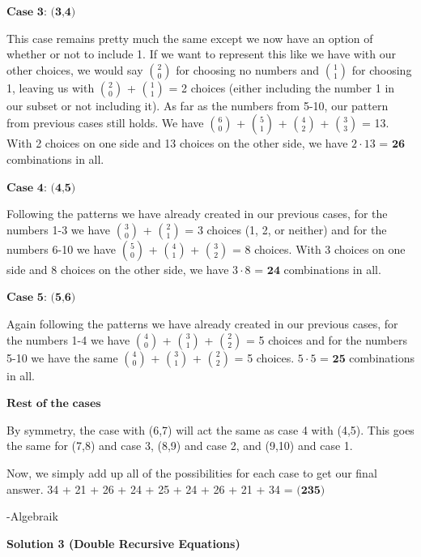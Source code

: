\begin{enumerate}
{{ 


 $\textbf{Case 3: (3,4)}$

 This case remains pretty much the same except we now have an option of whether or not to include 1. If we want to represent this like we have with our other choices, we would say $2 \choose {0}$ for choosing no numbers and $1 \choose {1}$ for choosing 1, leaving us with $2 \choose {0}$ + $1 \choose {1}$ = 2 choices (either including the number 1 in our subset or not including it). As far as the numbers from 5-10, our pattern from previous cases still holds. We have $6 \choose {0}$ + $5 \choose {1}$ + $4 \choose {2}$ + $3 \choose {3}$ = 13. With 2 choices on one side and 13 choices on the other side, we have $2\cdot13$ = $\textbf{26}$ combinations in all.

 


 $\textbf{Case 4: (4,5)}$

 Following the patterns we have already created in our previous cases, for the numbers 1-3 we have $3 \choose {0}$ + $2 \choose {1}$ = 3 choices (1, 2, or neither) and for the numbers 6-10 we have $5 \choose {0}$ + $4 \choose {1}$ + $3 \choose {2}$ = 8 choices. With 3 choices on one side and 8 choices on the other side, we have $3\cdot8$ = $\textbf{24}$ combinations in all.

 


 $\textbf{Case 5: (5,6)}$

 Again following the patterns we have already created in our previous cases, for the numbers 1-4 we have $4 \choose {0}$ + $3 \choose {1}$ + $2 \choose {2}$ = 5 choices and for the numbers 5-10 we have the same $4 \choose {0}$ + $3 \choose {1}$ + $2 \choose {2}$ = 5 choices. $5\cdot5$ = $\textbf{25}$ combinations in all.

 


 $\textbf{Rest of the cases}$

 By symmetry, the case with (6,7) will act the same as case 4 with (4,5). This goes the same for (7,8) and case 3, (8,9) and case 2, and (9,10) and case 1.

 


 Now, we simply add up all of the possibilities for each case to get our final answer. 34 + 21 + 26 + 24 + 25 + 24 + 26 + 21 + 34 = $\boxed{\textbf{(235)}}$

 
-Algebraik

 



\textbf{Solution 3 (Double Recursive Equations)}

}}
\end{enumerate}
